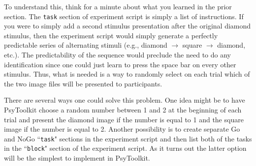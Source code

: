 To understand this, think for a minute about what you learned in the prior section.  The \texttt{task} section of experiment script is simply a list of instructions.  If you were to simply add a second stimulus presentation after the original diamond stimulus, then the experiment script would simply generate a perfectly predictable series of alternating stimuli (e.g., diamond $\rightarrow$ square $\rightarrow$ diamond, etc.).  The predictability of the sequence would preclude the need to do any identification since one could just learn to press the space bar on every other stimulus.  Thus, what is needed is a way to randomly select on each trial which of the two image files will be presented to participants.

There are several ways one could solve this problem.  One idea might be to have PsyToolkit choose a random number between 1 and 2 at the beginning of each trial and present the diamond image if the number is equal to 1 and the square image if the number is equal to 2. Another possibility is to create separate Go and NoGo ``\texttt{task}" sections in the experiment script and then list both of the tasks in the ``\texttt{block}" section of the experiment script.  As it turns out the latter option will be the simplest to implement in PsyToolkit.

